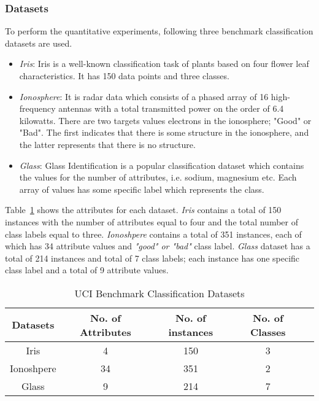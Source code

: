 \documentclass[english]{tktltiki2}
\theoremstyle{definition}
\theoremstyle{remark}
\begin{document}
\subsubsection{Datasets}
To perform the quantitative experiments, following three benchmark classification datasets are used.
\begin{center}
	\begin{itemize}
		\item \textit{Iris}: Iris is a well-known classification task of plants based on four flower leaf characteristics. It has 150 data points and three classes.
		\item \textit{Ionosphere}: It is radar data which consists of a phased array of 16 high-frequency antennas with a total transmitted power on the order of 6.4 kilowatts. 
		There are two targets values electrons in the ionosphere; "Good" or "Bad". The first indicates that there is some structure in the ionosphere, and the latter represents that there is no structure.
		\item \textit{Glass}: Glass Identification is a popular classification dataset which contains the values for the number of attributes, i.e. sodium, magnesium etc. 
		Each array of values has some specific label which represents the class.
	\end{itemize}
\end{center}

Table~\ref{table:datasets_UCI} shows the attributes for each dataset. \textit{Iris} contains a total of 150 instances with the number of attributes equal to four and the total number of class labels equal to three. \textit{Ionoshpere} contains a total of 351 instances, each of which has 34 attribute values and \textit{"good" or "bad"} class label. \textit{Glass} dataset has a total of 214 instances and total of 7 class labels; each instance has one specific class label and a total of 9 attribute values.

\begin{table}[H]
	\caption{UCI Benchmark Classification Datasets}
	\label{table:datasets_UCI}
	\begin{center}
	\begin{tabular}{|c|c|c|c|c|}
		\hline	
		\textbf{Datasets} & \textbf{No. of Attributes} & \textbf{No. of instances} & \textbf{No. of Classes} \\ \hline
		
		Iris  & 4 & 150 & 3 \\ \hline
		Ionoshpere  & 34 & 351 & 2 \\ \hline
		Glass  & 9 & 214 & 7 \\ \hline
	\end{tabular}
	\end{center}
\end{table}
\end{document}
